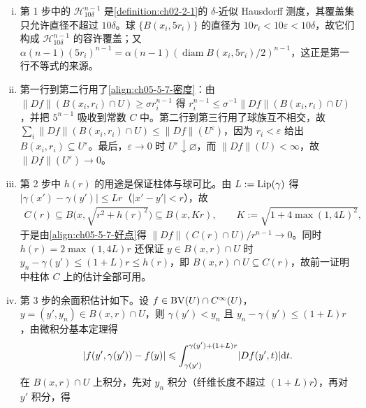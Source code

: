 \documentclass[../../main.tex]{subfiles}%
\begin{document}
\begin{remark}\label{remark:ch05-thm-5-7-补全}
\begin{enumerate}[(i)]
\item 第 1 步中的 $\mathcal{H}^{n-1}_{10\delta}$ 是\cref{definition:ch02-2-1}的 $\delta$-近似 Hausdorff 测度，其覆盖集只允许直径不超过 $10\delta$。球 $\{B(x_i,5r_i)\}$ 的直径为 $10r_i<10\varepsilon<10\delta$，故它们构成 $\mathcal{H}^{n-1}_{10\delta}$ 的容许覆盖；又 $\alpha(n-1)(5r_i)^{n-1}=\alpha(n-1)(\operatorname{diam}B(x_i,5r_i)/2)^{n-1}$，这正是第一行不等式的来源。%
\item 第一行到第二行用了\eqref{align:ch05-5-7-密度}：由 $\lVert Df\rVert(B(x_i,r_i)\cap U)\geqslant\sigma r_i^{n-1}$ 得 $r_i^{n-1}\leqslant\sigma^{-1}\lVert Df\rVert(B(x_i,r_i)\cap U)$，并把 $5^{n-1}$ 吸收到常数 $C$ 中。第二行到第三行用了球族互不相交，故 $\sum_i\lVert Df\rVert(B(x_i,r_i)\cap U)\leqslant\lVert Df\rVert(U^{\varepsilon})$，因为 $r_i<\varepsilon$ 给出 $B(x_i,r_i)\subseteq U^{\varepsilon}$。最后，$\varepsilon\to0$ 时 $U^{\varepsilon}\downarrow\varnothing$，而 $\lVert Df\rVert(U)<\infty$，故 $\lVert Df\rVert(U^{\varepsilon})\to0$。
\item 第 2 步中 $h(r)$ 的用途是保证柱体与球可比。由 $L:=\operatorname{Lip}(\gamma)$ 得 $\lvert\gamma(x')-\gamma(y')\rvert\leqslant Lr$（$\lvert x'-y'\rvert<r$），故
\begin{align*}
C(r)\subseteq B\bigl(x,\sqrt{r^2+h(r)^2}\bigr)\subseteq B(x,Kr),\qquad K:=\sqrt{1+4\max(1,4L)^2},
\end{align*}
于是由\eqref{align:ch05-5-7-好点}得 $\lVert Df\rVert(C(r)\cap U)/r^{n-1}\to0$。同时 $h(r)=2\max(1,4L)r$ 还保证 $y\in B(x,r)\cap U$ 时 $y_n-\gamma(y')\leqslant(1+L)r\leqslant h(r)$，即 $B(x,r)\cap U\subseteq C(r)$，故前一证明中柱体 $C$ 上的估计全部可用。
\item 第 3 步的余面积估计如下。设 $f\in\mathrm{BV}(U)\cap C^{\infty}(U)$，$y=(y',y_n)\in B(x,r)\cap U$，则 $\gamma(y')<y_n$ 且 $y_n-\gamma(y')\leqslant(1+L)r$，由微积分基本定理得
\begin{align*}
\lvert f(y',\gamma(y'))-f(y)\rvert\leqslant\int_{\gamma(y')}^{\gamma(y')+(1+L)r}\lvert Df(y',t)\rvert\mathrm{d} t .
\end{align*}
在 $B(x,r)\cap U$ 上积分，先对 $y_n$ 积分（纤维长度不超过 $(1+L)r$），再对 $y'$ 积分，得
\begin{align*}

\end{align*}
\end{enumerate}
\end{remark}
\end{document}
